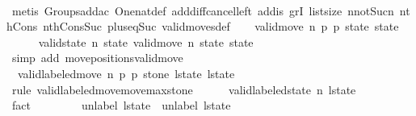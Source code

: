 \begin{isabellebody}
\ \ \ \ \isamarkupfalse%
\ {\isacharparenleft}metis\ Groups{\isachardot}add{\isacharunderscore}ac{\isacharparenleft}{}{\isacharparenright}\ One{\isacharunderscore}nat{\isacharunderscore}def\ add{\isacharunderscore}diff{\isacharunderscore}cancel{\isacharunderscore}left{\isacharprime}\ add{\isacharunderscore}is{\isacharunderscore}{}\ gr{}I\ list{\isachardot}size{\isacharparenleft}{}{\isacharparenright}\ n{\isacharunderscore}not{\isacharunderscore}Suc{\isacharunderscore}n\ nth{\isacharunderscore}Cons{\isacharunderscore}{}\ nth{\isacharunderscore}Cons{\isacharunderscore}Suc\ plus{\isacharunderscore}{}{\isacharunderscore}eq{\isacharunderscore}Suc\ valid{\isacharunderscore}moves{\isacharunderscore}def{\isacharparenright}\isanewline
\isanewline
\ \ \isamarkupfalse%
\ {\isachardoublequoteopen}valid{\isacharunderscore}move{\isacharprime}\ n\ {\isacharquery}p{}\ {\isacharquery}p{}\ {\isacharquery}state\ state{\isacharprime}{\isachardoublequoteclose}\isanewline
\ \ \ \ \isamarkupfalse%
\ {\isacharbackquoteopen}valid{\isacharunderscore}state\ n\ {\isacharquery}state{\isacharbackquoteclose}\ {\isacharbackquoteopen}valid{\isacharunderscore}move\ n\ {\isacharquery}state\ state{\isacharprime}{\isacharbackquoteclose}\isanewline
\ \ \ \ \isamarkupfalse%
\ {\isacharparenleft}simp\ add{\isacharcolon}\ move{\isacharunderscore}positions{\isacharunderscore}valid{\isacharunderscore}move{\isacharprime}{\isacharparenright}\isanewline
\isanewline
\ \ \isamarkupfalse%
\ {\isacharasterisk}{\isacharasterisk}{\isacharcolon}\ {\isachardoublequoteopen}valid{\isacharunderscore}labeled{\isacharunderscore}move{\isacharprime}\ n\ {\isacharquery}p{}\ {\isacharquery}p{}\ {\isacharquery}stone\ l{\isacharunderscore}state\ {\isacharquery}l{\isacharunderscore}state{\isacharprime}{\isachardoublequoteclose}\isanewline
\ \ \isamarkupfalse%
\ {\isacharparenleft}rule\ valid{\isacharunderscore}labeled{\isacharunderscore}move{\isacharunderscore}move{\isacharunderscore}max{\isacharunderscore}stone{\isacharparenright}\isanewline
\ \ \ \ \isamarkupfalse%
\ {\isachardoublequoteopen}valid{\isacharunderscore}labeled{\isacharunderscore}state\ n\ l{\isacharunderscore}state{\isachardoublequoteclose}\isanewline
\ \ \ \ \ \ \isamarkupfalse%
\ fact\isanewline
\ \ \isamarkupfalse%
\isanewline
\ \ \ \ \isamarkupfalse%
\ {\isachardoublequoteopen}unlabel\ l{\isacharunderscore}state\ {\isacharequal}\ unlabel\ l{\isacharunderscore}state{\isachardoublequoteclose}\isanewline

\end{isabellebody}
